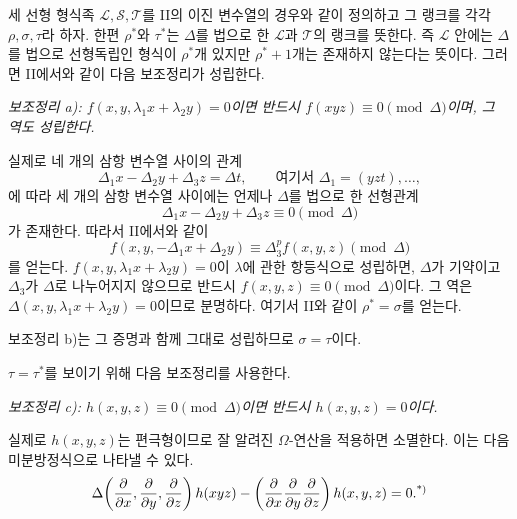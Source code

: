 세 선형 형식족 $\mathcal L,\mathcal S,\mathcal T$를 II의 이진 변수열의 경우와 같이 정의하고 그 랭크를 각각 $\rho,\sigma,\tau$라 하자. 한편 $\rho^*$와 $\tau^*$는 $\Delta$를 법으로 한 $\mathcal L$과 $\mathcal T$의 랭크를 뜻한다. 즉 $\mathcal L$ 안에는 $\Delta$를 법으로 선형독립인 형식이 $\rho^*$개 있지만 $\rho^*+1$개는 존재하지 않는다는 뜻이다. 그러면 II에서와 같이 다음 보조정리가 성립한다.

\emph{보조정리 a): $f(x,y,\lambda_1x+\lambda_2y)=0$이면 반드시 $f(xyz)\equiv0\pmod{\Delta}$이며, 그 역도 성립한다.}

실제로 네 개의 삼항 변수열 사이의 관계
\[
  \Delta_1x-\Delta_2y+\Delta_3z=\Delta t,
  \qquad \text{여기서 }\Delta_1=(yzt),\ldots,
\]
에 따라 세 개의 삼항 변수열 사이에는 언제나 $\Delta$를 법으로 한 선형관계
\[
  \Delta_1x-\Delta_2y+\Delta_3z\equiv0\pmod{\Delta}
\]
가 존재한다. 따라서 II에서와 같이
\[
  f(x,y,-\Delta_1x+\Delta_2y)\equiv\Delta_3^p f(x,y,z)\pmod{\Delta}
\]
를 얻는다. $f(x,y,\lambda_1x+\lambda_2y)=0$이 $\lambda$에 관한 항등식으로 성립하면, $\Delta$가 기약이고 $\Delta_3$가 $\Delta$로 나누어지지 않으므로 반드시 $f(x,y,z)\equiv0\pmod{\Delta}$이다. 그 역은 $\Delta(x,y,\lambda_1x+\lambda_2y)=0$이므로 분명하다. 여기서 II와 같이 $\rho^*=\sigma$를 얻는다.

보조정리 b)는 그 증명과 함께 그대로 성립하므로 $\sigma=\tau$이다.

$\tau=\tau^*$를 보이기 위해 다음 보조정리를 사용한다.

\emph{보조정리 c): $h(x,y,z)\equiv0\pmod{\Delta}$이면 반드시 $h(x,y,z)=0$이다.}

실제로 $h(x,y,z)$는 편극형이므로 잘 알려진 $\Omega$-연산을 적용하면 소멸한다. 이는 다음 미분방정식으로 나타낼 수 있다.
\[
  \Delta\!\left(\frac{\partial}{\partial x},\frac{\partial}{\partial y},\frac{\partial}{\partial z}\right)h(xyz)
  -\left(\frac{\partial}{\partial x}\frac{\partial}{\partial y}\frac{\partial}{\partial z}\right)h(x,y,z)=0.\srcfnmark{*)}
\]

